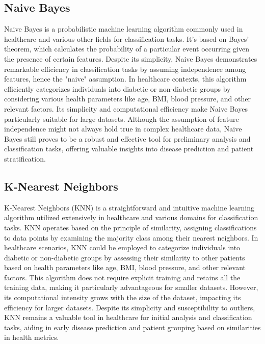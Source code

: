 \documentclass[11pt]{article}
\begin{document}
\subsection{Naive Bayes}
Naive Bayes is a probabilistic machine learning algorithm commonly used in healthcare and various other fields for classification tasks. It's based on Bayes' theorem, which calculates the probability of a particular event occurring given the presence of certain features. Despite its simplicity, Naive Bayes demonstrates remarkable efficiency in classification tasks by assuming independence among features, hence the "naive" assumption. In healthcare contexts, this algorithm efficiently categorizes individuals into diabetic or non-diabetic groups by considering various health parameters like age, BMI, blood pressure, and other relevant factors. Its simplicity and computational efficiency make Naive Bayes particularly suitable for large datasets. Although the assumption of feature independence might not always hold true in complex healthcare data, Naive Bayes still proves to be a robust and effective tool for preliminary analysis and classification tasks, offering valuable insights into disease prediction and patient stratification.

\subsection{K-Nearest Neighbors}
K-Nearest Neighbors (KNN) is a straightforward and intuitive machine learning algorithm utilized extensively in healthcare and various domains for classification tasks. KNN operates based on the principle of similarity, assigning classifications to data points by examining the majority class among their nearest neighbors. In healthcare scenarios, KNN could be employed to categorize individuals into diabetic or non-diabetic groups by assessing their similarity to other patients based on health parameters like age, BMI, blood pressure, and other relevant factors. This algorithm does not require explicit training and retains all the training data, making it particularly advantageous for smaller datasets. However, its computational intensity grows with the size of the dataset, impacting its efficiency for larger datasets. Despite its simplicity and susceptibility to outliers, KNN remains a valuable tool in healthcare for initial analysis and classification tasks, aiding in early disease prediction and patient grouping based on similarities in health metrics.
\end{document}
